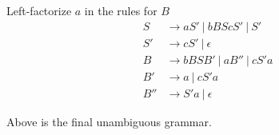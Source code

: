 \documentclass{article}
\begin{document}
Left-factorize $a$ in the rules for $B$
\begin{align*}
	S   & \rightarrow aS' ~|~ bBScS' ~|~ S'  \\
	S'  & \rightarrow cS' ~|~ \epsilon       \\
	B   & \rightarrow bBSB' ~|~ aB'' ~|~ cS'a \\
	B'  & \rightarrow a ~|~ cS'a             \\
	B'' & \rightarrow S'a ~|~ \epsilon
\end{align*}

Above is the final unambiguous grammar.
\end{document}
